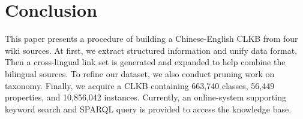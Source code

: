 \documentclass[runningheads,a4paper]{llncs}
\begin{document}
\section{Conclusion}
\label{sec:con}
This paper presents a procedure of building a Chinese-English CLKB from four wiki sources. At first, we extract structured information and unify data format. Then a cross-lingual link set is generated and expanded to help combine the bilingual sources. To refine our dataset, we also conduct pruning work on taxonomy. Finally, we acquire a CLKB containing 663,740 classes, 56,449 properties, and 10,856,042 instances. Currently, an online-system supporting keyword search and SPARQL query is provided to access the knowledge base.





\end{document}

